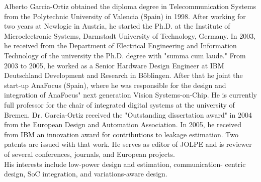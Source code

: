 \begin{IEEEbiography}{Alberto Garcia-Ortiz}
    obtained the diploma degree in
    Telecommunication Systems from the Polytechnic University of
    Valencia (Spain) in 1998. After working for two years at Newlogic
    in Austria, he started the Ph.D. at the Institute of
    Microelectronic Systems, Darmstadt University of Technology,
    Germany. In 2003, he received from the Department of Electrical
    Engineering and Information Technology of the university the
    Ph.D. degree with "summa cum laude." From 2003 to 2005, he worked
    as a Senior Hardware Design Engineer at IBM Deutschland
    Development and Research in B{\"o}blingen.  After that he joint the
    start-up AnaFocus (Spain), where he was responsible for the design
    and integration of AnaFocus" next generation Vision
    Systems-on-Chip. He is currently full professor for the chair of
    integrated digital systems at the university of Bremen.
    Dr. Garcia-Ortiz received the "Outstanding dissertation award" in
    2004 from the European Design and Automation Association. In 2005,
    he received from IBM an innovation award for contributions to
    leakage estimation. Two patents are issued with that work. He
    serves as editor of JOLPE and is reviewer of several conferences,
    journals, and European projects. \\
    His interests include low-power
    design and estimation, communication- centric design, SoC
    integration, and variations-aware design. 
\end{IEEEbiography}
